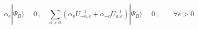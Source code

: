\begin{equation}
\alpha _{e}|\Psi _{B}\rangle =0\,,\quad \sum_{o>0}\left( \alpha
_{o}U_{-o,e}^{-1}+\alpha _{-o}U_{o,e}^{-1}\right) |\Psi _{B}\rangle =0\,,
\qquad \forall e>0
\end{equation}


